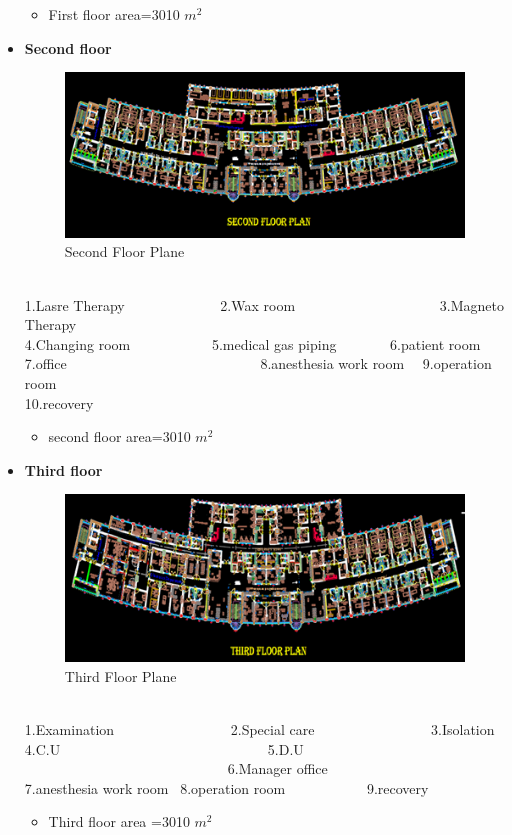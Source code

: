 \documentclass[12pt,fleqn]{book} %
\begin{document}
\begin{itemize}
\begin{itemize}
    \item First floor area=3010 $m^2$
\end{itemize}

	    
	    \item \textbf{Second floor}
	          \begin{figure}[h!]
    \centering
    \includegraphics[width=0.8\linewidth]{i 4.png}
    \caption{ Second Floor Plane}
    \label{fig:i 4}
\end{figure}

\\1.Lasre Therapy \ \ \ \ \ \ \ \ \ \ \ \ \   2.Wax room \ \ \ \ \ \ \ \ \ \ \ \ \ \ \  \ \ \ \ \ 3.Magneto Therapy
\\4.Changing room  \ \ \ \ \ \ \ \ \ \ \  5.medical gas piping \ \ \ \ \ \ \   6.patient room
\\7.office \ \ \ \ \ \ \ \ \ \ \ \ \ \ \ \ \ \ \ \ \ \ \ \ \ \ \  8.anesthesia work room \ \ 9.operation room
\\10.recovery
\begin{itemize}
    \item second floor area=3010 $m^2$
\end{itemize}
\newpage


	    
	    \item \textbf{Third floor}
	    \begin{figure}[h!]
    \centering
    \includegraphics[width=0.8\linewidth]{i 5.png}
    \caption{ Third Floor Plane}
    \label{fig:i 5}
\end{figure}
\\1.Examination \ \ \ \ \ \ \ \ \ \ \ \ \ \ \ \ 2.Special care \ \ \ \ \ \ \ \ \ \ \ \ \ \ \ \ 3.Isolation
\\4.C.U \ \ \ \ \ \ \ \  \ \ \ \ \ \ \ \ \ \  \ \ \ \ \ \ \ \ \ \ \ 5.D.U \ \ \ \ \ \ \ \ \ \ \ \ \ \ \ \ \ \ \ \ \ \ \ \ \ \ \ \ \ 6.Manager office 
\\7.anesthesia work room \  8.operation room \ \ \ \ \ \ \ \ \ \ \  9.recovery
\begin{itemize}
    \item Third floor area =3010 $m^2$
\end{itemize}



\end{itemize}
\end{document}
